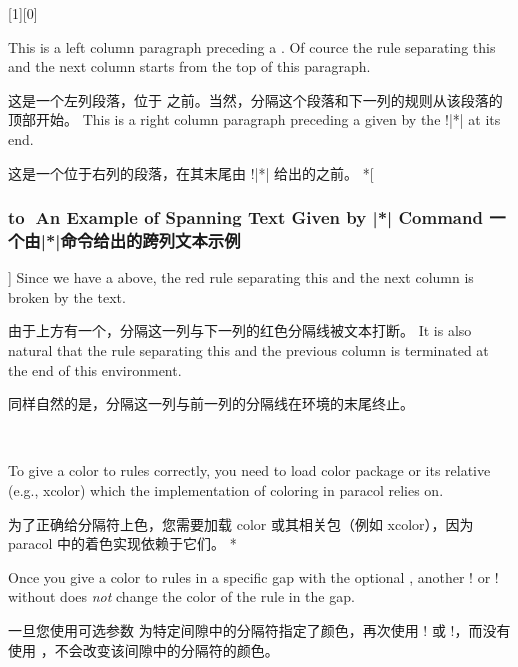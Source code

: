 [1][0]
\setcolumnwidth{\unitlength/0pt}
\begin{paracol}{3}\switchcolumn\noindent 
This is a left column paragraph preceding a \mctext.  Of cource the rule
separating this and the next column starts from the top of this paragraph.

这是一个左列段落，位于 \mctext 之前。当然，分隔这个段落和下一列的规则从该段落的顶部开始。
\switchcolumn\noindent
This is a right column paragraph preceding a \mctext{} given by the
\!\switchcolumn!|*| at its end.

这是一个位于右列的段落，在其末尾由 \!\switchcolumn!|*| 给出的\mctext{}之前。
\switchcolumn[1]*[\subsubsection*{\hbox to\unitlength{}
An Example of Spanning Text Given by |*| Command \hfill 一个由|*|命令给出的跨列文本示例}]
Since we have a \mctext{} above, the red rule separating this and the next
column is broken by the text.

由于上方有一个\mctext{}，分隔这一列与下一列的红色分隔线被文本打断。
\switchcolumn
It is also natural that the rule separating this and the previous column is
terminated at the end of this  environment.

同样自然的是，分隔这一列与前一列的分隔线在环境的末尾终止。
\end{paracol}
\columnratio{}

\begin{description}
\Item[]\mbox{}
\begin{itemize}
\begin{paracol}{2}
\Item
To give a color to rules correctly, you need to load \textsf{color}
package or its relative (e.g., \textsf{xcolor}) which the implementation
of coloring in \textsf{paracol} relies on.
\switchcolumn\item
为了正确给分隔符上色，您需要加载 \textsf{color} 或其相关包（例如 \textsf{xcolor}），因为 \textsf{paracol} 中的着色实现依赖于它们。
\switchcolumn[0]*
\item
Once you give a color to rules in a specific gap with the optional
, another \!\colseprulecolor! or \!\normalcolseprulecolor!
without  does \emph{not} change the color of the rule in the
gap.
\switchcolumn\item
一旦您使用可选参数  为特定间隙中的分隔符指定了颜色，再次使用 \!\colseprulecolor! 或 \!\normalcolseprulecolor!，而没有使用 ，不会改变该间隙中的分隔符的颜色。
\end{paracol}
\end{itemize}
\end{description}
